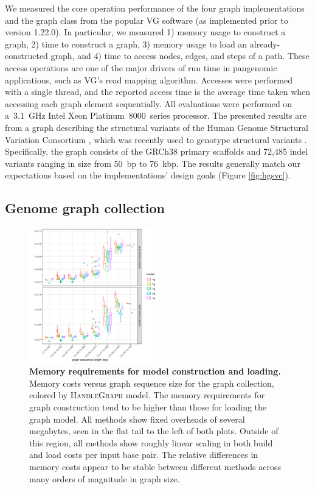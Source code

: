 \documentclass[11pt]{ucthesis}
\begin{document}
We measured the core operation performance of the four graph implementations and the graph class from the popular \textsc{VG} software (as implemented prior to version 1.22.0).
In particular, we measured 1) memory usage to construct a graph, 2) time to construct a graph, 3) memory usage to load an already-constructed graph, and 4) time to access nodes, edges, and steps of a path.
These access operations are one of the major drivers of run time in pangenomic applications, such as \textsc{VG}'s read mapping algorithm. 
Accesses were performed with a single thread, and the reported access time is the average time taken when accessing each graph element sequentially.
All evaluations were performed on a~3.1~GHz Intel Xeon Platinum~8000~series processor.
The presented results are from a graph describing the structural variants of the Human Genome Structural Variation Consortium \cite{chaisson2019multi}, which was recently used to genotype structural variants \cite{hickey2020genotyping}.
Specifically, the graph consists of the GRCh38 primary scaffolds and 72,485 indel variants ranging in size from 50~bp to 76~kbp.
The results generally match our expectations based on the implementations' design goals (Figure \ref{fig:hgsvc}).

\subsection{Genome graph collection}

\begin{figure}
  \centering
  \includegraphics[width=0.5\textwidth]{handlefigures/build_and_load_memory_boxplot.pdf}
  \caption{
    \label{fig:prof1}
    \textbf{Memory requirements for model construction and loading.}
    Memory costs versus graph sequence size for the graph collection, colored by \textsc{HandleGraph} model.
    The memory requirements for graph construction tend to be higher than those for loading the graph model.
    All methods show fixed overheads of several megabytes, seen in the flat tail to the left of both plots.
    Outside of this region, all methods show roughly linear scaling in both build and load costs per input base pair.
    The relative differences in memory costs appear to be stable between different methods across many orders of magnitude in graph size.
    }
\end{figure}
 
\end{document}

